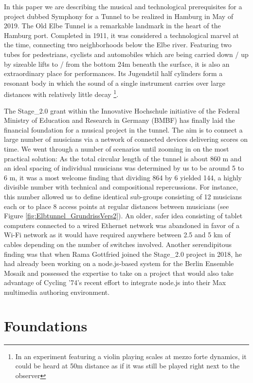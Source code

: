 In this paper we are describing the musical and technological prerequisites for a project dubbed Symphony for a Tunnel to be realized in Hamburg in May of 2019. The Old Elbe Tunnel is a remarkable landmark in the heart of the Hamburg port. Completed in 1911, it was considered a technological marvel at the time, connecting two neighborhoods below the Elbe river. Featuring two tubes for pedestrians, cyclists and automobiles which are being carried down / up by sizeable lifts to / from the bottom 24m beneath the surface, it is also an extraordinary place for performances. Its Jugendstil half cylinders form a resonant body in which the sound of a single instrument carries over large distances with relatively little decay \footnote{In an experiment featuring a violin playing scales at mezzo forte dynamics, it could be heard at 50m distance as if it was still be played right next to the observer}.

The Stage\_2.0 grant within the Innovative Hochschule initiative of the Federal Ministry of Education and Research in Germany (BMBF) has finally laid the financial foundation for a musical project in the tunnel. The aim is to connect a large number of musicians via a network of connected devices delivering scores on time. We went through a number of scenarios until zooming in on the most practical solution: As the total circular length of the tunnel is about 860 m and an ideal spacing of individual musicians was determined by us to be around 5 to 6 m, it was a most welcome finding that dividing 864 by 6 yielded 144, a highly divisible number with technical and compositional repercussions. For instance, this number allowed us to define identical sub-groups consisting of 12 musicians each or to place 8 access points at regular distances between musicians (see Figure \ref{fig:Elbtunnel_GrundrissVers2}). An older, safer idea consisting of tablet computers connected to a wired Ethernet network was abandoned in favor of a Wi-Fi network as it would have required anywhere between 2.5 and 5 km of cables depending on the number of switches involved. 
Another serendipitous finding was that when Rama Gottfried joined the Stage\_2.0 project in 2018, he had already been working on a node.js-based system for the Berlin Ensemble Mosaik and possessed the expertise to take on a project that would also take advantage of Cycling ’74’s recent effort to integrate node.js into their Max multimedia authoring environment.




\section{Foundations} \label{sec:foundations} 
%
%  
%
%


